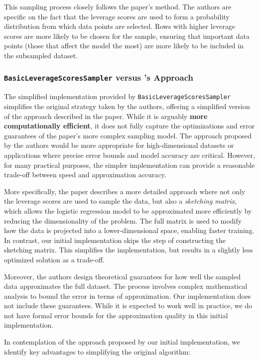 \documentclass{article}
\theoremstyle{plain}
\theoremstyle{definition}
\theoremstyle{remark}
\begin{document}
This sampling process closely follows the paper’s method. The authors are specific on the fact that the leverage scores are used to form a probability distribution from which data points are selected. Rows with higher leverage scores are more likely to be chosen for the sample, ensuring that important data points (those that affect the model the most) are more likely to be included in the subsampled dataset.

\subsubsection{\texttt{BasicLeverageScoresSampler} versus \citeauthor{chow24}'s Approach}

The simplified implementation provided by \texttt{BasicLeverageScoresSampler} simplifies the original strategy taken by the authors, offering a simplified version of the approach described in the paper. While it is arguably \textbf{more computationally efficient}, it does not fully capture the optimizations and error guarantees of the paper's more complex sampling model. The approach proposed by the authors would be more appropriate for high-dimensional datasets or applications where precise error bounds and model accuracy are critical. However, for many practical purposes, the simpler implementation can provide a reasonable trade-off between speed and approximation accuracy.

More specifically, the paper describes a more detailed approach where not only the leverage scores are used to sample the data, but also a \textit{sketching matrix}, which allows the logistic regression model to be approximated more efficiently by reducing the dimensionality of the problem. The full matrix is used to modify how the data is projected into a lower-dimensional space, enabling faster training. In contrast, our initial implementation skips the step of constructing the sketching matrix. This simplifies the implementation, but results in a slightly less optimized solution as a trade-off.

Moreover, the authors design theoretical guarantees for how well the sampled data approximates the full dataset. The process involves complex mathematical analysis to bound the error in terms of approximation. Our implementation does not include these guarantees. While it is expected to work well in practice, we do not have formal error bounds for the approximation quality in this initial implementation.

In contemplation of the approach proposed by our initial implementation, we identify key advantages to simplifying the original algorithm:
\end{document}
